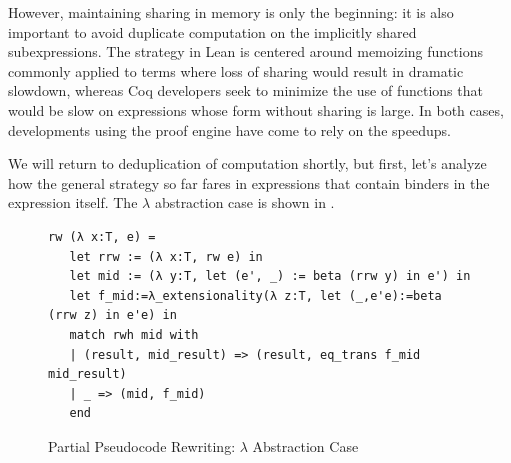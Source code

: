 \documentclass[sn-mathphys,pdflatex]{sn-jnl}%
\makeatletter
\renewcommand{\todo}[2][]{\tikzexternaldisable\@todo[#1]{#2}\tikzexternalenable}
\theoremstyle{thmstyleone}%
\theoremstyle{thmstyletwo}%
\theoremstyle{thmstylethree}%
\makeatother
\begin{document}
However, maintaining sharing in memory is only the beginning: it is also important to avoid duplicate computation on the implicitly shared subexpressions.
The strategy in Lean is centered around memoizing functions commonly applied to terms where loss of sharing would result in dramatic slowdown, whereas Coq developers seek to minimize the use of functions that would be slow on expressions whose form without sharing is large.
In both cases, developments using the proof engine have come to rely on the speedups.

We will return to deduplication of computation shortly, but first, let's analyze how the general strategy so far fares in expressions that contain binders in the expression itself.
The $\lambda$ abstraction case is shown in .

\begin{figure}
\begin{verbatim}
rw (λ x:T, e) =
   let rrw := (λ x:T, rw e) in
   let mid := (λ y:T, let (e', _) := beta (rrw y) in e') in
   let f_mid:=λ_extensionality(λ z:T, let (_,e'e):=beta (rrw z) in e'e) in
   match rwh mid with
   | (result, mid_result) => (result, eq_trans f_mid mid_result)
   | _ => (mid, f_mid)
   end
\end{verbatim}
\caption{\label{fig:rw-lam}Partial Pseudocode Rewriting: $\lambda$ Abstraction Case}
\end{figure}
\end{document}
